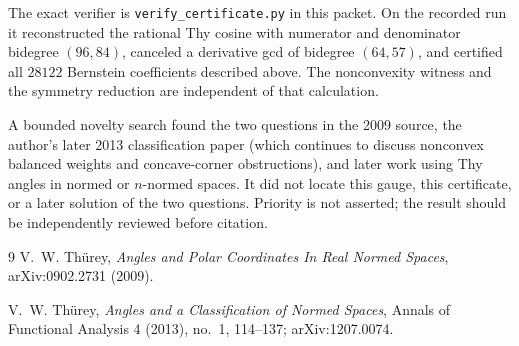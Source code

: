 \documentclass[11pt]{article}
\begin{document}
The exact verifier is \texttt{verify\_certificate.py} in this packet.  On
the recorded run it reconstructed the rational Thy cosine with numerator and
denominator bidegree $(96,84)$, canceled a derivative gcd of bidegree
$(64,57)$, and certified all $28122$ Bernstein coefficients described above.
The nonconvexity witness and the symmetry reduction are independent of that
calculation.

A bounded novelty search found the two questions in the 2009 source, the
author's later 2013 classification paper (which continues to discuss
nonconvex balanced weights and concave-corner obstructions), and later work
using Thy angles in normed or $n$-normed spaces.  It did not locate this
gauge, this certificate, or a later solution of the two questions.  Priority
is not asserted; the result should be independently reviewed before citation.

\begin{thebibliography}{9}
V.~W. Th\"urey,
\emph{Angles and Polar Coordinates In Real Normed Spaces},
arXiv:0902.2731 (2009).

V.~W. Th\"urey,
\emph{Angles and a Classification of Normed Spaces},
Annals of Functional Analysis 4 (2013), no.~1, 114--137;
arXiv:1207.0074.
\end{thebibliography}
\end{document}

